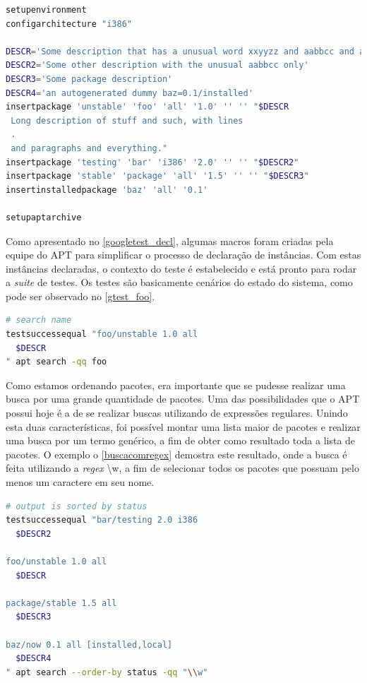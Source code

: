 \begin{lstlisting}[language=Bash,label=googletest_decl,caption={Declarações de instâncias para o teste}]
setupenvironment
configarchitecture "i386"

DESCR='Some description that has a unusual word xxyyzz and aabbcc and a UPPERCASE'
DESCR2='Some other description with the unusual aabbcc only'
DESCR3='Some package description'
DESCR4='an autogenerated dummy baz=0.1/installed'
insertpackage 'unstable' 'foo' 'all' '1.0' '' '' "$DESCR
 Long description of stuff and such, with lines
 .
 and paragraphs and everything."
insertpackage 'testing' 'bar' 'i386' '2.0' '' '' "$DESCR2"
insertpackage 'stable' 'package' 'all' '1.5' '' '' "$DESCR3"
insertinstalledpackage 'baz' 'all' '0.1'

setupaptarchive
\end{lstlisting}

Como apresentado no \autoref{googletest_decl}, algumas macros foram criadas pela equipe do {\code APT} para simplificar o processo de declaração de instâncias. Com estas instâncias declaradas, o contexto do teste é estabelecido e está pronto para rodar a \textit{suite} de testes. Os testes são basicamente cenários do estado do sistema, como pode ser observado no \autoref{gtest_foo}.

\begin{lstlisting}[language=Bash,label=gtest_foo,caption={Teste de busca pelo pacote \textit{foo}}]
# search name
testsuccessequal "foo/unstable 1.0 all
  $DESCR
" apt search -qq foo
\end{lstlisting}

Como estamos ordenando pacotes, era importante que se pudesse realizar uma busca por uma grande quantidade de pacotes. Uma das possibilidades que o {\code APT} possui hoje é a de se realizar buscas utilizando de expressões regulares. Unindo esta duas características, foi possível montar uma lista maior de pacotes e realizar uma busca por um termo genérico, a fim de obter como resultado toda a lista de pacotes. O exemplo o \autoref{buscacomregex} demostra este resultado, onde a busca é feita utilizando a \textit{regex} {\code \textbackslash w}, a fim de selecionar todos os pacotes que possuam pelo menos um caractere em seu nome.

\begin{lstlisting}[language=Bash,label=buscacomregex,caption={Busca com uso de expressão regular}]
# output is sorted by status
testsuccessequal "bar/testing 2.0 i386
  $DESCR2

foo/unstable 1.0 all
  $DESCR

package/stable 1.5 all
  $DESCR3

baz/now 0.1 all [installed,local]
  $DESCR4
" apt search --order-by status -qq "\\w"
\end{lstlisting}

